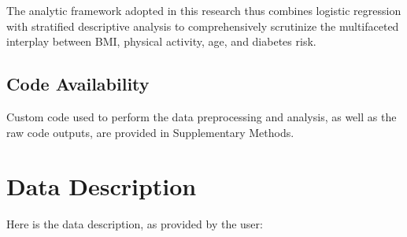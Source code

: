 \documentclass[11pt]{article}
\begin{document}
The analytic framework adopted in this research thus combines logistic regression with stratified descriptive analysis to comprehensively scrutinize the multifaceted interplay between BMI, physical activity, age, and diabetes risk.\subsection*{Code Availability}

Custom code used to perform the data preprocessing and analysis, as well as the raw code outputs, are provided in Supplementary Methods.






\clearpage
\appendix

\section{Data Description} \label{sec:data_description} Here is the data description, as provided by the user:
\end{document}
